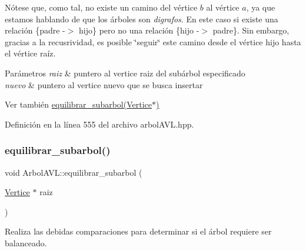 Nótese que, como tal, no existe un camino del vértice $b$ al vértice $a$, ya que estamos hablando de que los árboles son {\itshape digrafos}. En este caso si existe una relación \{padre -\/$>$ hijo\} pero no una relación \{hijo -\/$>$ padre\}. Sin embargo, gracias a la recusrividad, es posible \char`\"{}seguir\char`\"{} este camino desde el vértice hijo hasta el vértice raíz. 
\begin{DoxyParams}{Parámetros}
{\em raiz} & puntero al vertice raiz del subárbol especificado \\
\hline
{\em nuevo} & puntero al vertice nuevo que se busca insertar \\
\hline
\end{DoxyParams}
\begin{DoxySeeAlso}{Ver también}
\hyperlink{classArbolAVL_ad24ffafb198dac21a98ff19e8361fbd6}{equilibrar\+\_\+subarbol(\+Vertice$\ast$)} 
\end{DoxySeeAlso}


Definición en la línea 555 del archivo arbol\+A\+V\+L.\+hpp.

\mbox{\label{classArbolAVL_ad24ffafb198dac21a98ff19e8361fbd6}} 
\subsubsection{\texorpdfstring{equilibrar\+\_\+subarbol()}{equilibrar\_subarbol()}}
{\footnotesize\ttfamily void Arbol\+A\+V\+L\+::equilibrar\+\_\+subarbol (\begin{DoxyParamCaption}\item[{\hyperlink{classVertice}{Vertice} $\ast$}]{raiz }\end{DoxyParamCaption})\hspace{0.3cm}{\ttfamily [protected]}}



Realiza las debidas comparaciones para determinar si el árbol requiere ser balanceado. 

